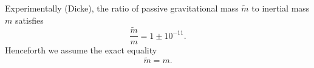 Experimentally (Dicke), the ratio of passive gravitational mass $\tilde{m}$ to inertial mass $m$ satisfies
$$\frac{\tilde{m}}{m} = 1 \pm 10^{-11}.$$
Henceforth we assume the exact equality
$$\tilde{m} = m.$$
